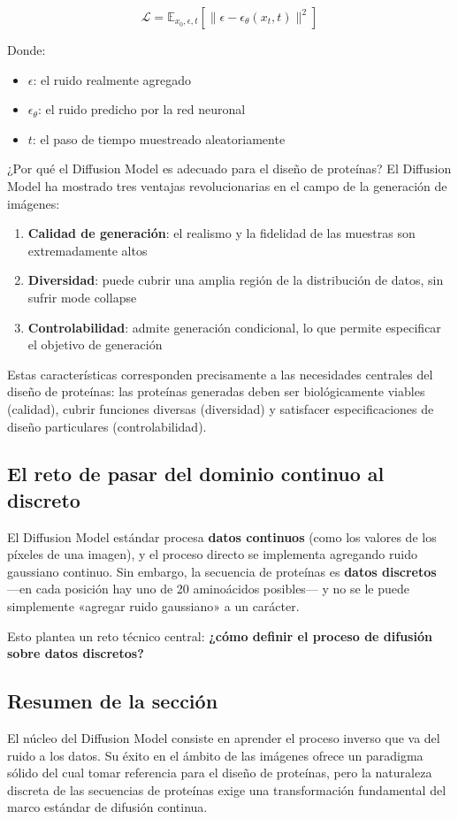 $$\mathcal{L} = \mathbb{E}_{x_0, \epsilon, t} \left[ \| \epsilon - \epsilon_\theta(x_t, t) \|^2 \right]$$

Donde:
\begin{itemize}
    \item $\epsilon$: el ruido realmente agregado
    \item $\epsilon_\theta$: el ruido predicho por la red neuronal
    \item $t$: el paso de tiempo muestreado aleatoriamente
\end{itemize}

\begin{importantbox}{¿Por qué el Diffusion Model es adecuado para el diseño de proteínas?}
El Diffusion Model ha mostrado tres ventajas revolucionarias en el campo de la generación de imágenes:
\begin{enumerate}
    \item \textbf{Calidad de generación}: el realismo y la fidelidad de las muestras son extremadamente altos
    \item \textbf{Diversidad}: puede cubrir una amplia región de la distribución de datos, sin sufrir mode collapse
    \item \textbf{Controlabilidad}: admite generación condicional, lo que permite especificar el objetivo de generación
\end{enumerate}
Estas características corresponden precisamente a las necesidades centrales del diseño de proteínas: las proteínas generadas deben ser biológicamente viables (calidad), cubrir funciones diversas (diversidad) y satisfacer especificaciones de diseño particulares (controlabilidad).
\end{importantbox}

\subsection{El reto de pasar del dominio continuo al discreto}

El Diffusion Model estándar procesa \textbf{datos continuos} (como los valores de los píxeles de una imagen), y el proceso directo se implementa agregando ruido gaussiano continuo. Sin embargo, la secuencia de proteínas es \textbf{datos discretos} —en cada posición hay uno de 20 aminoácidos posibles— y no se le puede simplemente «agregar ruido gaussiano» a un carácter.

Esto plantea un reto técnico central: \textbf{¿cómo definir el proceso de difusión sobre datos discretos?}

\subsection{Resumen de la sección}

El núcleo del Diffusion Model consiste en aprender el proceso inverso que va del ruido a los datos. Su éxito en el ámbito de las imágenes ofrece un paradigma sólido del cual tomar referencia para el diseño de proteínas, pero la naturaleza discreta de las secuencias de proteínas exige una transformación fundamental del marco estándar de difusión continua.

